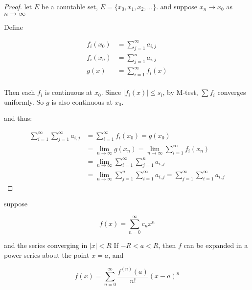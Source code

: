 \begin{proof}
    let $E$ be a countable set, $E = \{ x_0, x_1, x_2, ...\}$.
    and suppose $x_n \to x_0$ as $n \to \infty$

    Define

    \begin{align*}
        f_i(x_0) &= \sum_{j=1}^{\infty}a_{i,j} \\
        f_i(x_n) &= \sum_{j=1}^{n}a_{i,j} \\
        g(x) &= \sum_{i=1}^{\infty} f_i(x) \\
    \end{align*}

    Then each $f_i$ is continuous at $x_0$.
    Since $|f_i(x)| \le s_i$, by M-test, $\sum f_i$ converges uniformly.
    So $g$ is also continuous at $x_0$.

    and thus:

    \begin{align*}
        \sum_{i=1}^{\infty}\sum_{j=1}^{\infty}a_{i,j} &= \sum_{i=1}^{\infty}f_i(x_0) = g(x_0) \\
        &= \lim_{n \to \infty} g(x_n) = \lim_{n \to \infty}\sum_{i=1}^{\infty} f_i(x_n) \\
        &= \lim_{n \to \infty} \sum_{i=1}^{\infty} \sum_{j=1}^{n} a_{i,j} \\
        &= \lim_{n \to \infty} \sum_{j=1}^{n} \sum_{i=1}^{\infty} a_{i,j} = \sum_{j=1}^{\infty} \sum_{i=1}^{\infty} a_{i,j}
    \end{align*}
\end{proof}

\begin{thm}
    suppose 

    \[
        f(x) = \sum_{n=0}^{\infty}c_n x^n
    \]

    and the series converging in $|x| < R$
    If $-R < a < R$, then $f$ can be expanded in a power series about the point
    $x = a$, and

    \[
        f(x) = \sum_{n=0}^{\infty} \frac{f^{(n)}(a)}{n!}(x-a)^n
    \]
\end{thm}

